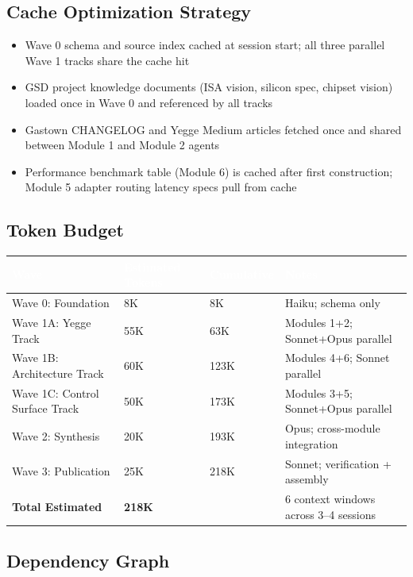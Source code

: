 \documentclass[11pt,letterpaper]{article}
\newcommand{\tableheader}[1]{\textbf{\sffamily\textcolor{white}{#1}}}
\begin{document}
\subsection{Cache Optimization Strategy}

\begin{itemize}
  \item Wave 0 schema and source index cached at session start; all three parallel Wave 1 tracks share the cache hit
  \item GSD project knowledge documents (ISA vision, silicon spec, chipset vision) loaded once in Wave 0 and referenced by all tracks
  \item Gastown CHANGELOG and Yegge Medium articles fetched once and shared between Module 1 and Module 2 agents
  \item Performance benchmark table (Module 6) is cached after first construction; Module 5 adapter routing latency specs pull from cache
\end{itemize}

\subsection{Token Budget}

\begin{center}
\begin{tabularx}{\textwidth}{L{4cm}C{2.5cm}C{2.5cm}X}
\toprule
{}
\tableheader{Wave} & \tableheader{Estimated Tokens} & \tableheader{Cumulative} & \tableheader{Notes} \\
\midrule
Wave 0: Foundation & 8K & 8K & Haiku; schema only \\
Wave 1A: Yegge Track & 55K & 63K & Modules 1+2; Sonnet+Opus parallel \\
Wave 1B: Architecture Track & 60K & 123K & Modules 4+6; Sonnet parallel \\
Wave 1C: Control Surface Track & 50K & 173K & Modules 3+5; Sonnet+Opus parallel \\
Wave 2: Synthesis & 20K & 193K & Opus; cross-module integration \\
Wave 3: Publication & 25K & 218K & Sonnet; verification + assembly \\
\midrule
\textbf{Total Estimated} & \textbf{218K} & & 6 context windows across 3--4 sessions \\
\bottomrule
\end{tabularx}
\end{center}

\subsection{Dependency Graph}
\end{document}
